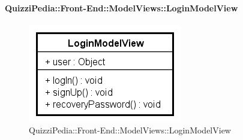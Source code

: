 \paragraph{QuizziPedia::Front-End::ModelViews::LoginModelView}
	
	\label{QuizziPedia::Front-End::ModelViews::LoginModelView}
	
	\begin{figure}[ht]
		\centering
		\includegraphics[scale=0.80,keepaspectratio]{UML/Classi/Front-End/QuizziPedia_Front-end_ModelView_LoginModelView.png}
		\caption{QuizziPedia::Front-End::ModelViews::LoginModelView}
	\end{figure} \FloatBarrier
	
